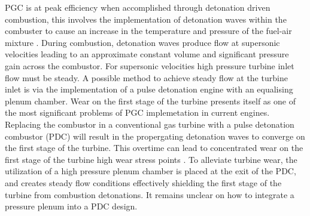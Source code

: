 PGC is at peak efficiency when accomplished through detonation driven combustion, this involves the implementation of detonation waves within the combuster to cause an increase in the temperature and pressure of the fuel-air mixture \citep{eidelman1991review}. During combustion, detonation waves produce flow at supersonic velocities leading to an approximate constant volume and significant pressure gain across the combustor. For supersonic velocities high pressure turbine inlet flow must be steady. A possible method to achieve steady flow at the turbine inlet is via the implementation of a pulse detonation engine \citep{kailasanath2009research} with an equalising plenum chamber. Wear on the first stage of the turbine presents itself as one of the most significant problems of PGC implemetation in current engines. Replacing the combustor in a conventional gas turbine with a pulse detonation combustor (PDC) will result in the propergating detonation waves to converge on the first stage of the turbine. This overtime can lead to concentrated wear on the first stage of the turbine high wear stress points \cite{dean2005operation}. To alleviate turbine wear, the utilization of a high pressure plenum chamber is placed at the exit of the PDC, and creates steady flow conditions effectively shielding the first stage of the turbine from combustion detonations. It remains unclear on how to integrate a pressure plenum into a PDC design. 

